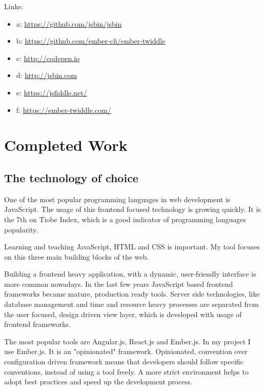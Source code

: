 \documentclass[11pt, a4paper, twoside, openright]{report}
\begin{document}
Links:
\begin{itemize}[noitemsep]
\item a: \url{https://github.com/jsbin/jsbin} \\
\item b: \url{https://github.com/ember-cli/ember-twiddle} \\
\item c: \url{http://codepen.io} \\
\item d: \url{http://jsbin.com} \\
\item e: \url{https://jsfiddle.net/} \\
\item f: \url{https://ember-twiddle.com/} \\
\end{itemize}

\chapter{Completed Work}

\section{The technology of choice}

One of the most popular programming languages in web development is JavaScript. The usage of this frontend focused technology is growing quickly.  It is the 7th on Tiobe Index, which is a good indicator of programming languages popularity. \cite{tiobe}

Learning and teaching JavaScript, HTML and CSS is important. My tool focuses on this three main building blocks of the web.

Building a frontend heavy application, with a dynamic, user-friendly interface is more common nowadays. In the last few years JavaScript based frontend frameworks became mature, production ready tools. Server side technologies, like database management and time and resource heavy processes are separated from the user focused, design driven view layer, which is developed with usage of frontend frameworks.

The most popular tools are Angular.js, React.js and Ember.js. In my project I use Ember.js. It is an "opinionated" framework. Opinionated, convention over configuration driven framework means that developers should follow specific conventions, instead of using a tool freely. A more strict environment helps to adopt best practices and speed up the development process.
\end{document}
